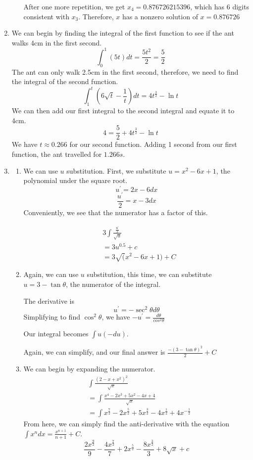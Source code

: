 \documentclass[11pt, letterpaper, twoside]{article}
\begin{document}
\begin{enumerate}
\begin{enumerate}[label=\alph*)]
After one more repetition, we get \(x_4=0.876726215396\), which has 6 digits consistent with \(x_3\).
Therefore, \(x\) has a nonzero solution of \(\boxed{x=0.876726}\)

\end{enumerate}

\item %
We can begin by finding the integral of the first function to see if the ant walks 4cm in the first second.
\[\int_0^1(5t)dt=\frac{5t^2}{2}=\frac{5}{2}\]
The ant can only walk 2.5cm in the first second, therefore, we need to find the integral of the second function.
\[\int_1^t(6\sqrt t-\frac{1}{t})dt=4t^{\frac{3}{2}}-\ln t\]
We can then add our first integral to the second integral and equate it to 4cm.
\[4=\frac{5}{2}+4t^{\frac{3}{2}}-\ln t \]
We have \(t\approx0.266\) for our second function. 
Adding 1 second from our first function, the ant travelled for \(\boxed{1.266s}\).

\item %
\begin{enumerate}[label=\alph*)]
\item We can use \(u\) substitution. 
First, we substitute \(u=x^2-6x+1\), the polynomial under the square root.
\[u^\prime=2x-6 dx\]
\[\frac{u^\prime}{2}=x-3dx\]
Conveniently, we see that the numerator has a factor of this.

\begin{align*}
&3\int \frac{\frac{u^\prime}{2}}{\sqrt{u}}\\
&= 3u^{0.5}+c\\
&= \boxed{3\sqrt(x^2-6x+1)+C}
\end{align*}
\item Again, we can use \(u\) substitution, this time, 
we can substitute \(u=3-\tan\theta\), the numerator of the integral.

The derivative is 
\[u^\prime=-\sec^2\theta d\theta\]
Simplifying to find \(\cos^2\theta\), we have \(-u^\prime=\frac{d\theta}{cos^2\theta}\)

Our integral becomes \(\int u (-du)\). 

Again, we can simplify, and our final answer is \(\boxed{\frac{-(3-\tan\theta)^2}{2}+C}\)

\item We can begin by expanding the numerator.
\begin{align*}
&\int\frac{(2-x+x^2)^2}{\sqrt x}\\
&=\int\frac{x^4-2x^3+5x^2-4x+4}{\sqrt x}\\
&=\int x^{\frac{7}{2}}-2x^{\frac{5}{2}}+5x^{\frac{3}{2}}-4x^{\frac{1}{2}}+4x^{-\frac{1}{2}}
\end{align*}
From here, we can simply find the anti-derivative with the equation \(\int x^ndx=\frac{x^{n+1}}{n+1}+C\).
\[\boxed{\frac{2x^{\frac{9}{2}}}{9}-\frac{4x^{\frac{7}{2}}}{7}+2x^{\frac{5}{2}}-\frac{8x^{\frac{3}{2}}}{3}+8\sqrt x+c}\]


\end{enumerate}
\end{enumerate}
\end{document}

